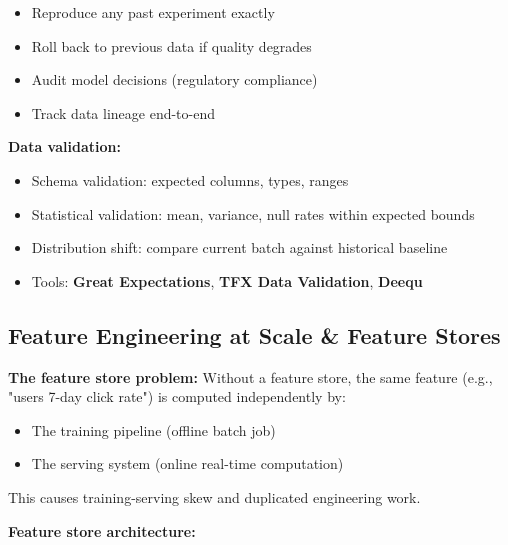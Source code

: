 \documentclass[11pt]{article}
\providecommand{\tightlist}{\setlength{\itemsep}{1pt}\setlength{\parskip}{0pt}}
\begin{document}
\begin{itemize}
\tightlist
\item
  Reproduce any past experiment exactly
\item
  Roll back to previous data if quality degrades
\item
  Audit model decisions (regulatory compliance)
\item
  Track data lineage end-to-end
\end{itemize}

\textbf{Data validation:}

\begin{itemize}
\tightlist
\item
  Schema validation: expected columns, types, ranges
\item
  Statistical validation: mean, variance, null rates within expected bounds
\item
  Distribution shift: compare current batch against historical baseline
\item
  Tools: \textbf{Great Expectations}, \textbf{TFX Data Validation}, \textbf{Deequ}
\end{itemize}

\subsection{Feature Engineering at Scale \& Feature Stores}\label{feature-engineering-at-scale--feature-stores}

\textbf{The feature store problem:}
Without a feature store, the same feature (e.g., "user\textquotesingle s 7-day click rate") is computed independently by:

\begin{itemize}
\tightlist
\item
  The training pipeline (offline batch job)
\item
  The serving system (online real-time computation)
\end{itemize}

This causes training-serving skew and duplicated engineering work.

\textbf{Feature store architecture:}

\setcodelang{}
\end{document}
